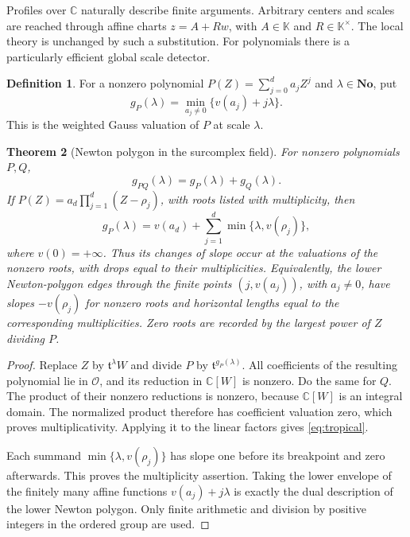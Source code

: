 \documentclass[11pt,a4paper]{article}
\numberwithin{equation}{section}
\newtheorem{theorem}{Theorem}[section]
\theoremstyle{definition}
\newtheorem{definition}[theorem]{Definition}
\newcommand{\No}{\mathbf{No}}
\newcommand{\K}{\mathbb K}
\newcommand{\C}{\mathbb C}
\newcommand{\tmon}{\mathfrak t}
\newcommand{\OO}{\mathcal O}
\begin{document}
Profiles over $\C$ naturally describe finite arguments. Arbitrary centers and
scales are reached through affine charts $z=A+R w$, with $A\in\K$ and
$R\in\K^\times$. The local theory is unchanged by such a substitution.
For polynomials there is a particularly efficient global scale detector.

\begin{definition}
For a nonzero polynomial $P(Z)=\sum_{j=0}^d a_j Z^j$ and $\lambda\in\No$, put
\[
 g_P(\lambda)=\min_{a_j\neq0}\{v(a_j)+j\lambda\}.
\]
This is the weighted Gauss valuation of $P$ at scale $\lambda$.
\end{definition}

\begin{theorem}[Newton polygon in the surcomplex field]\label{thm:newton}
For nonzero polynomials $P,Q$,
\[
 g_{PQ}(\lambda)=g_P(\lambda)+g_Q(\lambda).
\]
If
$P(Z)=a_d\prod_{j=1}^d(Z-\rho_j)$, with roots listed with multiplicity, then
\begin{equation}\label{eq:tropical}
 g_P(\lambda)=v(a_d)+\sum_{j=1}^d\min\{\lambda,v(\rho_j)\},
\end{equation}
where $v(0)=+\infty$. Thus its changes of slope occur at the valuations of
the nonzero roots, with drops equal to their multiplicities. Equivalently,
the lower Newton-polygon edges through the finite points $(j,v(a_j))$,
with $a_j\neq0$, have slopes $-v(\rho_j)$ for nonzero roots and horizontal
lengths equal to the corresponding multiplicities. Zero roots are recorded
by the largest power of $Z$ dividing $P$.
\end{theorem}
\begin{proof}
Replace $Z$ by $\tmon^\lambda W$ and divide $P$ by
$\tmon^{g_P(\lambda)}$. All coefficients of the resulting polynomial lie in
$\OO$, and its reduction in $\C[W]$ is nonzero. Do the same for $Q$.
The product of their nonzero reductions is nonzero, because $\C[W]$ is an
integral domain. The normalized product therefore has coefficient valuation
zero, which proves multiplicativity. Applying it to the linear factors gives
\eqref{eq:tropical}.

Each summand $\min\{\lambda,v(\rho_j)\}$ has slope one before its breakpoint
and zero afterwards. This proves the multiplicity assertion. Taking the
lower envelope of the finitely many affine functions $v(a_j)+j\lambda$
is exactly the dual description of the lower Newton polygon. Only finite
arithmetic and division by positive integers in the ordered group are used.
\end{proof}
\end{document}
